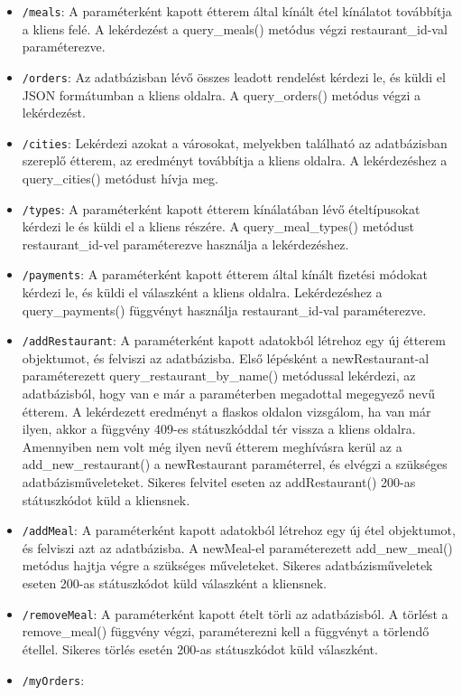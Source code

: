 \begin{itemize}
\item \texttt{/meals}:
A paraméterként kapott étterem által kínált étel kínálatot továbbítja a kliens felé. A lekérdezést a query\_meals() metódus végzi restaurant\_id-val paraméterezve.
\item \texttt{/orders}:
Az adatbázisban lévő összes leadott rendelést kérdezi le, és küldi el JSON formátumban a kliens oldalra. A query\_orders() metódus végzi a lekérdezést.
\item \texttt{/cities}:
Lekérdezi azokat a városokat, melyekben található az adatbázisban szereplő étterem, az eredményt továbbítja a kliens oldalra. A lekérdezéshez a query\_cities() metódust hívja meg.
\item \texttt{/types}:
A paraméterként kapott étterem kínálatában lévő ételtípusokat kérdezi le és küldi el a kliens részére. A query\_meal\_types() metódust restaurant\_id-vel paraméterezve használja a lekérdezéshez.
\item \texttt{/payments}:
A paraméterként kapott étterem által kínált fizetési módokat kérdezi le, és küldi el válaszként a kliens oldalra. Lekérdezéshez a query\_payments() függvényt használja restaurant\_id-val paraméterezve.
\item \texttt{/addRestaurant}:
A paraméterként kapott adatokból létrehoz egy új étterem objektumot, és felviszi az adatbázisba. Első lépésként a newRestaurant-al paraméterezett query\_restaurant\_by\_name() metódussal lekérdezi, az adatbázisból, hogy van e már a paraméterben megadottal megegyező nevű étterem. A lekérdezett eredményt a flaskos oldalon vizsgálom, ha van már ilyen, akkor a függvény 409-es státuszkóddal tér vissza a kliens oldalra. Amennyiben nem volt még ilyen nevű étterem meghívásra kerül az a add\_new\_restaurant() a newRestaurant paraméterrel, és elvégzi a szükséges adatbázisműveleteket. Sikeres felvitel eseten az addRestaurant() 200-as státuszkódot küld a kliensnek.
\item \texttt{/addMeal}:
A paraméterként kapott adatokból létrehoz egy új étel objektumot, és felviszi azt az adatbázisba. A newMeal-el paraméterezett add\_new\_meal() metódus hajtja végre a szükséges műveleteket. Sikeres adatbázisműveletek eseten 200-as státuszkódot küld válaszként a kliensnek.
\item \texttt{/removeMeal}:
A paraméterként kapott ételt törli az adatbázisból. A törlést a remove\_meal() függvény végzi, paraméterezni kell a függvényt a törlendő étellel. Sikeres törlés esetén 200-as státuszkódot küld válaszként.
\item \texttt{/myOrders}:

\end{itemize}
